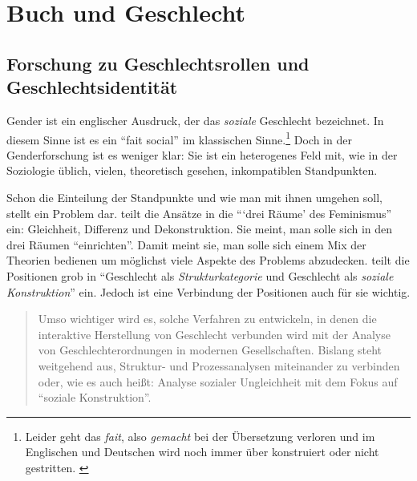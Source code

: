 \chapter{Buch und Geschlecht}

\section{Forschung zu Geschlechtsrollen und Geschlechtsidentität}


 Gender ist ein englischer Ausdruck, der das \emph{soziale} Geschlecht bezeichnet. In diesem Sinne ist es ein \hyphenquote{french}{fait social} im klassischen Sinne.\footnote{Leider geht das \emph{fait}, also \emph{gemacht} bei der Übersetzung verloren und im Englischen und Deutschen wird noch immer über konstruiert oder nicht gestritten. \parencite[152--161]{Latour2010}} \parencite[Kap.\,1]{Durkheim1970} Doch in der Genderforschung ist es weniger klar: Sie ist ein heterogenes Feld mit, wie in der Soziologie üblich, vielen, theoretisch gesehen, inkompatiblen Standpunkten. \parencite[67]{Nissen1998} 

Schon die Einteilung der Standpunkte und wie man mit ihnen umgehen soll, stellt ein Problem dar.  teilt die Ansätze in die \enquote{\enquote{drei Räume} des Feminismus} ein: Gleichheit, Differenz und Dekonstruktion. Sie meint, man solle sich in den drei Räumen \enquote{einrichten}. Damit meint sie, man solle sich einem Mix der Theorien bedienen um möglichst viele Aspekte des Problems abzudecken.  teilt die Positionen grob in \enquote{Geschlecht als \emph{Strukturkategorie} und Geschlecht als \emph{soziale Konstruktion}} ein. Jedoch ist eine Verbindung der Positionen auch für sie wichtig.
\blockcquote[223]{Gildemeister2000}{Umso wichtiger wird es, solche Verfahren zu entwickeln, in denen die interaktive Herstellung von Geschlecht verbunden wird mit der Analyse von Geschlechterordnungen in modernen Gesellschaften. Bislang steht weitgehend aus, Struktur- und Prozessanalysen miteinander zu verbinden oder, wie es auch heißt: Analyse sozialer Ungleichheit mit dem Fokus auf \enquote{soziale Konstruktion}.}
	
